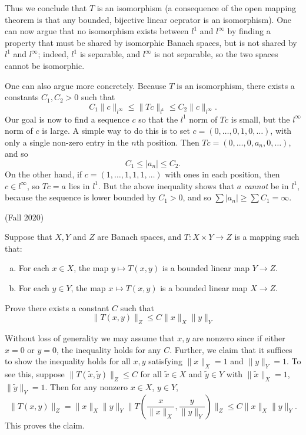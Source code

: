 \documentclass[answers]{exam}
\begin{document}
\begin{questions}
\begin{solution}
   Thus we conclude that $T$ is an isomorphism (a consequence of the open mapping theorem is that any bounded, bijective linear oeprator is an isomorphism).  One can now argue that no isomorphism exists between $l^1$ and $l^\infty$ by finding a property that must be shared by isomorphic Banach spaces, but is not shared by $l^1$ and $l^\infty$; indeed, $l^1$ is separable, and $l^\infty$ is not separable, so the two spaces cannot be isomorphic.

   One can also argue more concretely. Because $T$ is an isomorphism, there exists a constants $C_1,C_2 > 0$ such that
   \[ C_1 \| c \|_{l^\infty} \leq \| Tc \|_{l^1} \leq C_2 \| c \|_{l^\infty}. \]
   Our goal is now to find a sequence $c$ so that the $l^1$ norm of $Tc$ is small, but the $l^\infty$ norm of $c$ is large. A simple way to do this is to set $c = (0,\dots,0,1,0,\dots)$, with only a single non-zero entry in the $n$th position. Then $Tc = (0,\dots,0,a_n,0,\dots)$, and so
   \[ C_1 \leq |a_n| \leq C_2. \]
   On the other hand, if $c = (1,\dots,1,1,1,\dots)$ with ones in each position, then $c \in l^\infty$, so $Tc = a$ lies in $l^1$. But the above inequality shows that $a$ \emph{cannot} be in $l^1$, because the sequence is lower bounded by $C_1 > 0$, and so $\sum |a_n| \geq \sum C_1 = \infty$.
\end{solution}

\question (Fall 2020)

Suppose that $X,Y$ and $Z$ are Banach spaces, and $T:X\times Y\to Z$ is a mapping such that:
\begin{enumerate}[(a)]
\item For each $x\in X$, the map $y\mapsto T(x,y)$ is a bounded linear map $Y\to Z$.
\item For each $y\in Y$, the map $x\mapsto T(x,y)$ is a bounded linear map $X\to Z$.
\end{enumerate}
Prove there exists a constant $C$ such that
\begin{equation*}
\| T(x,y) \|_Z \leq C \| x \|_X \| y \|_Y
\end{equation*}

\begin{solution}
  Without loss of generality we may assume that $x,y$ are nonzero since if either $x=0$ or $y=0$, the inequality holds for any $C$. Further, we claim that it suffices to show the inequality holds for all $x,y$ satisfying $\| x \|_{X}=1$ and $\| y \|_{Y}=1.$ To see this, suppose $\| T(\tilde{x},\tilde{y}) \|_{Z}\leq C$ for all $\tilde{x}\in X$ and $\tilde{y}\in Y$ with $\| \tilde{x} \|_{X}=1$, $\| \tilde{y} \|_{Y}=1$. Then for any nonzero $x\in X$, $y\in Y$,
  \begin{equation*}
    \| T(x,y) \|_{Z}= \| x \|_{X} \|y \|_{Y} \| T \left( \frac{x}{ \| x \|_{X}},\frac{y}{\| y \|_{Y}} \right) \|_{Z} \leq C \| x \|_{X} \| y \|_Y.
  \end{equation*}
  This proves the claim.



\end{solution}
\end{questions}
\end{document}
